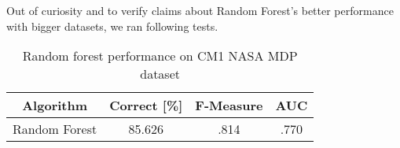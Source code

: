 Out of curiosity and to verify claims about Random Forest's better performance with bigger datasets, we ran following tests.

\begin{table}[h!]
\centering
\begin{tabular}{ |c|c|c|c| }
 \hline
 \textbf{Algorithm} & \textbf{Correct [\%]} & \textbf{F-Measure} & \textbf{AUC}  \\
 \hline
 Random Forest & 85.626 & .814 & .770    \\
 \hline

\end{tabular}
\caption{Random forest performance on CM1 NASA MDP dataset}
\label{table:DT_1}
\end{table}